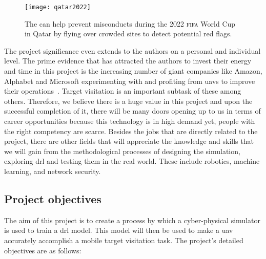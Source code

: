 \documentclass[../main.tex]{subfiles}
\begin{document}
\begin{figure}[tb] 
    \centering
    \texttt{[image: qatar2022]} 
    \caption{The \uav can help prevent misconducts during
    the 2022 \textsc{fifa} World Cup in Qatar by flying 
    over crowded sites to detect potential red flags.} 
    \label{fig:fifa} 
\end{figure}

The project significance even extends to the authors
on a personal and individual level.
The prime evidence that has attracted the authors to invest
their energy and time in this project is
the increasing number of giant companies like Amazon, Alphabet
and Microsoft experimenting with and profiting from \glspl{uav}
to improve their operations~\cite{Jun17}.
Target visitation is an important subtask of these among others.
Therefore, we believe there is a huge value
in this project and upon the successful completion of it,
there will be many doors opening up to us in terms of
career opportunities because 
this technology is in high demand yet, 
people with the right competency
are scarce.
Besides the jobs that are directly related to the project,
there are other fields that will appreciate the knowledge
and skills that we will gain from the methodological processes 
of designing the simulation,
exploring \gls{drl} and testing them in the real world.
These include robotics, machine learning, and 
network security.

\subsection{Project objectives}\label{sec:objectives}

The aim of this project is to create a process 
by which a cyber-physical simulator is used to train 
a \gls{drl} model. This model will then be used
to make a \gls{uav} accurately accomplish a
mobile target visitation task.
The project's detailed objectives are as follows:
\end{document}
